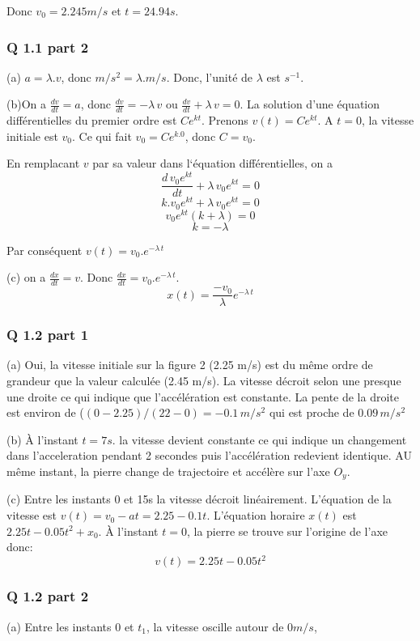 \documentclass[]{book}
\theoremstyle{definition}
\begin{document}
Donc $v_0 = 2.245m/s$ et $t=24.94s$. 

\subsubsection*{Q 1.1 part 2}
(a) $a = \lambda . v$, donc $m/s^2 = \lambda . m/s$. Donc, l'unit\'e de $\lambda$ est $s^{-1}$.


(b)On a $\frac{dv}{dt} = a$, donc $\frac{dv}{dt} = -\lambda\, v$ ou $\frac{dv}{dt} + \lambda\, v = 0$. 
La solution d'une \'equation diff\'erentielles du premier ordre est $Ce^{kt}$. 
Prenons $v(t) = Ce^{kt}$. A $t=0$, la vitesse initiale
est $v_0$. Ce qui fait $v_0 = Ce^{k.0}$, donc $C = v_0$. 


En remplacant $v$ par sa valeur dans l`\'equation diff\'erentielles, on a 
$$ \frac{d\, v_0e^{kt}}{dt} + \lambda\, v_0e^{kt} = 0$$
$$ k.v_0e^{kt} + \lambda\, v_0e^{kt} = 0$$
$$ v_0e^{kt}(k + \lambda) = 0$$
$$ k = -\lambda $$

Par cons\'equent $v(t) = v_0.e^{-\lambda\, t}$

(c) on a $\frac{dx}{dt} = v$. Donc $\frac{dx}{dt} = v_0.e^{-\lambda\, t}$. 
$$x(t) =  \frac{-v_0}{\lambda}e^{-\lambda\, t}$$

\subsubsection*{Q 1.2 part 1}
(a) Oui, la vitesse initiale sur la figure 2 (2.25 m/s) est du m\^eme ordre de grandeur que la 
valeur calcul\'ee (2.45 m/s). La vitesse d\'ecroit selon une presque une droite ce qui indique 
que l'acc\'el\'eration est constante. La pente de la droite est environ de ($(0-2.25)/(22-0) = -0.1\,m/s^2$
qui est proche de $0.09\,m/s^2$


(b) \`A l'instant $t=7s$. la vitesse devient constante ce qui indique un changement dans l'acceleration
pendant 2 secondes puis l'acc\'el\'eration redevient identique. AU m\^eme instant, 
la pierre change de trajectoire et acc\'el\`ere sur l'axe $O_y$.


(c) Entre les instants 0 et 15s la vitesse d\'ecroit lin\'eairement. L'\'equation de la vitesse 
est $v(t) = v_0 - at = 2.25 - 0.1t$. L'\'equation horaire $x(t)$ est $2.25t - 0.05t^2 + x_0$. 
\`A l'instant $t = 0$, la pierre se trouve sur l'origine de l'axe donc:
$$ v(t) = 2.25t - 0.05t^2$$
 
\subsubsection*{Q 1.2 part 2}
(a) Entre les instants 0 et $t_1$, la vitesse oscille autour de $0m/s$,
\end{document}
